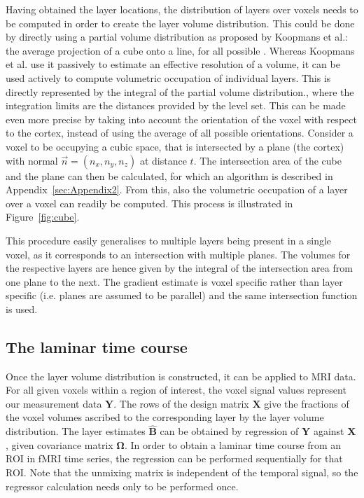 Having obtained the layer locations, the distribution of layers over voxels needs to be computed in order to create the layer volume distribution. This could be done by directly using a partial volume distribution as proposed by Koopmans et al.\cite{Koopmans2011}: the average projection of a cube onto a line, for all possible . Whereas Koopmans et al. \cite{Koopmans2011} use it passively to estimate an effective resolution of a volume, it can be used actively to compute volumetric occupation of individual layers. This is directly represented by the integral of the partial volume distribution., where the integration limits are the distances provided by the level set. This can be made even more precise by taking into account the orientation of the voxel with respect to the cortex, instead of using the average of all possible orientations. Consider a voxel to be occupying a cubic space, that is intersected by a plane (the cortex) with normal $\vec{n}=(n_x, n_y, n_z)$ at distance $t$. The intersection area of the cube and the plane can then be calculated, for which an algorithm is described in Appendix~\ref{sec:Appendix2}. From this, also the volumetric occupation of a layer over a voxel can readily be computed. This process is illustrated in Figure~\ref{fig:cube}.

This procedure easily generalises to multiple layers being present in a single voxel, as it corresponds to an intersection with multiple planes. The volumes for the respective layers are hence given by the integral of the intersection area from one plane to the next. The gradient estimate is voxel specific rather than layer specific (i.e. planes are assumed to be parallel) and the same intersection function is used. 

\subsection{The laminar time course}
Once the layer volume distribution is constructed, it can be applied to MRI data. For all given voxels within a region of interest, the voxel signal values represent our measurement data $\mathbf{Y}$. The rows of the design matrix $\mathbf{X}$ give the fractions of the voxel volumes ascribed to the corresponding layer by the layer volume distribution. The layer estimates $\mathbf{\hat{B}}$ can be obtained by regression of $\mathbf{Y}$ against $\mathbf{X}$, given covariance matrix $\mathbf{\Omega}$. In order to obtain a laminar time course from an ROI in fMRI time series, the regression can be performed sequentially for that ROI. Note that the unmixing matrix is independent of the temporal signal, so the regressor calculation needs only to be performed once.

